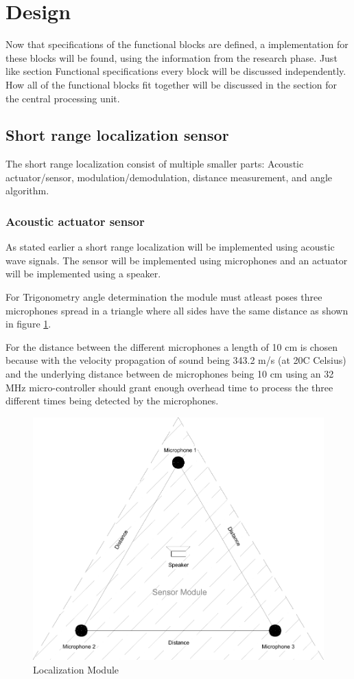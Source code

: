 \documentclass[10pt,a4paper]{article}
\begin{document}
\section{Design}
Now that specifications of the functional blocks are defined, a implementation for these blocks will be found, using the information from the research phase. Just like section Functional specifications every block will be discussed independently. How all of the functional blocks fit together will be discussed in the section for the central processing unit.


\subsection{Short range localization sensor}
The short range localization consist of multiple smaller parts: Acoustic actuator/sensor, modulation/demodulation, distance measurement, and angle algorithm. 

\subsubsection{Acoustic actuator sensor}
As stated earlier a short range localization will be implemented using acoustic wave signals. The sensor will be implemented using microphones and an actuator will be implemented using a speaker. 

For Trigonometry angle determination the module must atleast poses three microphones spread in a triangle where all sides have the same distance as shown in figure \ref{module}.

For the distance between the different microphones a length of 10 cm is chosen because with the velocity propagation of sound being 343.2 m/s (at 20\degree C Celsius) and the underlying distance between de microphones being 10 cm using an 32 MHz micro-controller should grant enough overhead time to process the three different times being detected by the microphones. 

\begin{figure}[H]
\centering
\includegraphics[width=1\textwidth]{Module.pdf}
\caption{Localization Module}
\label{module}
\end{figure}
\end{document}
